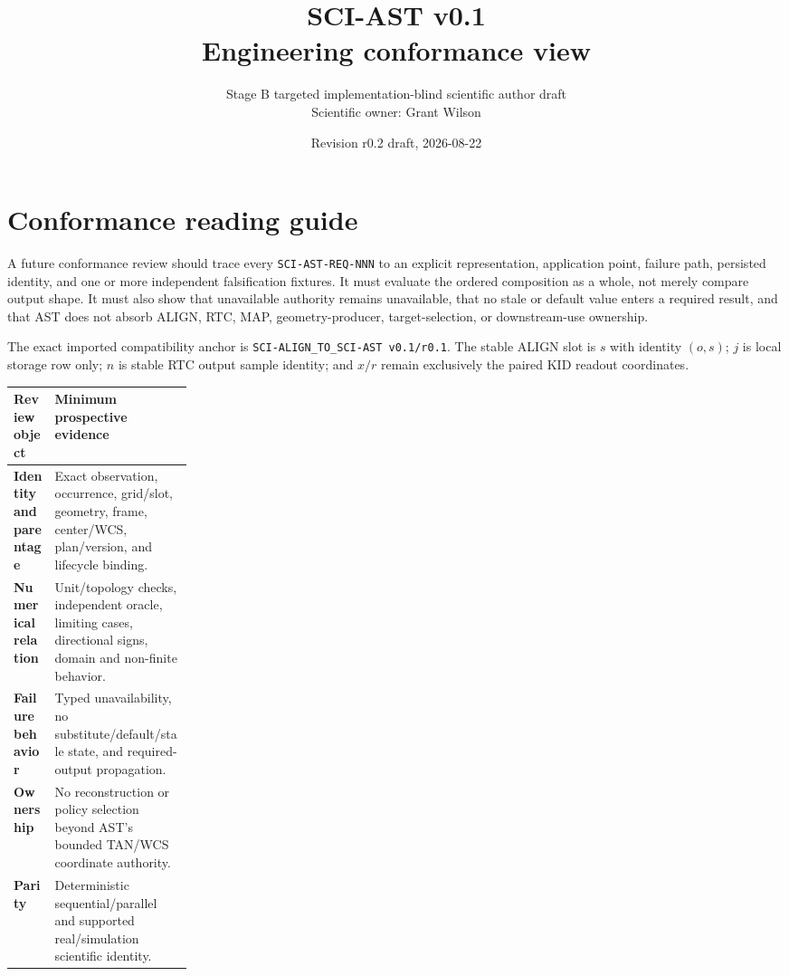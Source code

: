 \documentclass[10pt]{article}
\title{\vspace{-1.3em}\textcolor{astnavy}{\textbf{SCI-AST v0.1}}\\
\large Engineering conformance view}
\author{Stage B targeted implementation-blind scientific author draft\\
Scientific owner: Grant Wilson}
\date{Revision r0.2 draft, 2026-08-22}
\begin{document}
\maketitle
\thispagestyle{empty}

\begin{center}
\end{center}

\section*{Conformance reading guide}

A future conformance review should trace every \texttt{SCI-AST-REQ-NNN} to an
explicit representation, application point, failure path, persisted identity,
and one or more independent falsification fixtures.  It must evaluate the
ordered composition as a whole, not merely compare output shape.  It must also
show that unavailable authority remains unavailable, that no stale or default
value enters a required result, and that AST does not absorb ALIGN, RTC, MAP,
geometry-producer, target-selection, or downstream-use ownership.

The exact imported compatibility anchor is
\nolinkurl{SCI-ALIGN_TO_SCI-AST v0.1/r0.1}.  The stable ALIGN slot is $s$ with
identity $(o,s)$; $j$ is local storage row only; $n$ is stable RTC output
sample identity; and $x/r$ remain exclusively the paired KID readout
coordinates.

\begin{center}
\begin{tabularx}{0.96\linewidth}{>{\bfseries}p{0.23\linewidth}X}
\toprule
Review object & Minimum prospective evidence \\
\midrule
Identity and parentage & Exact observation, occurrence, grid/slot, geometry,
frame, center/WCS, plan/version, and lifecycle binding. \\
Numerical relation & Unit/topology checks, independent oracle, limiting cases,
directional signs, domain and non-finite behavior. \\
Failure behavior & Typed unavailability, no substitute/default/stale state,
and required-output propagation. \\
Ownership & No reconstruction or policy selection beyond AST's bounded
TAN/WCS coordinate authority. \\
Parity & Deterministic sequential/parallel and supported real/simulation
scientific identity. \\
\bottomrule
\end{tabularx}
\end{center}
\end{document}

